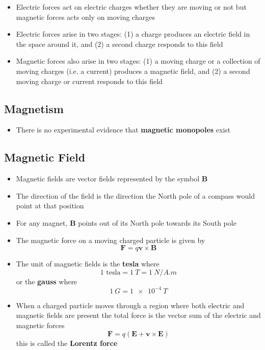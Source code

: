 \documentclass{article}
\begin{document}
\begin{itemize}
  \item Electric forces act on electric charges whether they are moving or not but magnetic forces acts only on moving charges

  \item Electric forces arise in two stages: (1) a charge produces an electric field in the space around it, and (2) a second charge responds to this field

  \item Magnetic forces also arise in two stages: (1) a moving charge or a collection of moving charges (i.e. a current) produces a magnetic field, and (2) a second moving charge or current responds to this field
\end{itemize}

\subsection{Magnetism}

\begin{itemize}
  \item There is no experimental evidence that \textbf{magnetic monopoles} exist
\end{itemize}

\subsection{Magnetic Field}

\begin{itemize}
  \item Magnetic fields are vector fields represented by the symbol $\mathbf{B}$

  \item The direction of the field is the direction the North pole of a compass would point at that position

  \item For any magnet, $\mathbf{B}$ points out of its North pole towards its South pole

  \item The magnetic force on a moving charged particle is given by \[\mathbf{F} = q \mathbf{v} \times \mathbf{B}\]

  \item The unit of magnetic fields is the \textbf{tesla} where \[1\textrm{ tesla} = \qty{1}{T} = \qty{1}{N/A.m}\] or the \textbf{gauss} where \[\qty{1}{G} = \qty{1e-4}{T}\]

  \item When a charged particle moves through a region where both electric and magnetic fields are present the total force is the vector sum of the electric and magnetic forces \[\mathbf{F} = q (\mathbf{E} + \mathbf{v} \times \mathbf{E})\] this is called the \textbf{Lorentz force}
\end{itemize}
\end{document}
